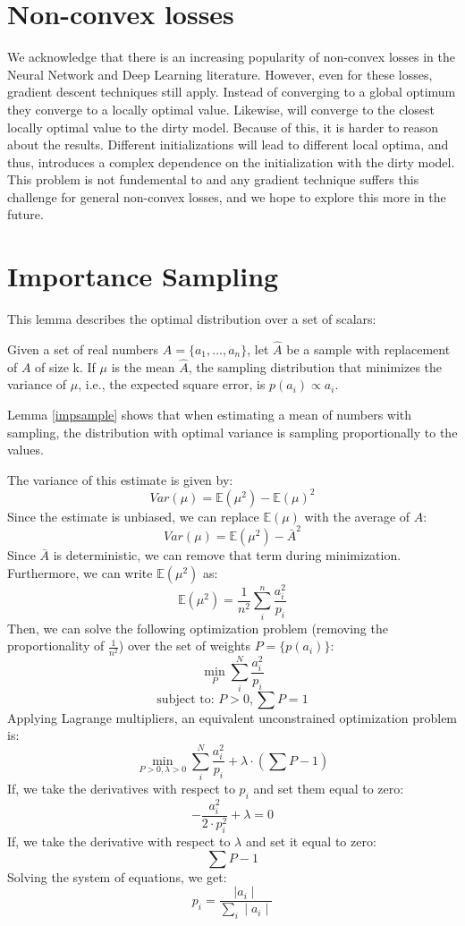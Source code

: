\section{Non-convex losses}\label{non-convex}
We acknowledge that there is an increasing popularity of non-convex losses in the Neural Network and Deep Learning literature. 
However, even for these losses, gradient descent techniques still apply. 
Instead of converging to a global optimum they converge to a locally optimal value. 
Likewise, \sys will converge to the closest locally optimal value to the dirty model. 
Because of this, it is harder to reason about the results.
Different initializations will lead to different local optima, and thus, introduces a complex dependence on the initialization with the dirty model.
This problem is not fundemental to \sys and any gradient technique suffers this challenge for general non-convex losses, and we hope to explore this more in the future.

\section{Importance Sampling}\label{impsample-deriv}
This lemma describes the optimal distribution over a set of scalars:
\begin{lemma}\label{impsample}
Given a set of real numbers $A = \{a_1,...,a_n\}$, let $\hat{A}$ be 
a sample with replacement of $A$ of size k.
If $\mu$ is the mean $\hat{A}$, the sampling distribution that minimizes
 the variance of $\mu$, i.e., the expected square error, is $p(a_i) \propto a_i$.
\end{lemma}
Lemma \ref{impsample} shows that when estimating a mean of numbers with sampling, the distribution with optimal variance is sampling proportionally to the values.

The variance of this estimate is given by:
\[
Var(\mu) = \mathbb{E}(\mu^2)-\mathbb{E}(\mu)^2
\] 
Since the estimate is unbiased, we can replace $\mathbb{E}(\mu)$ with the average of $A$:
\[
Var(\mu) = \mathbb{E}(\mu^2)-\bar{A}^2
\]
Since $\bar{A}$ is deterministic, we can remove that term during minimization.
Furthermore, we can write $\mathbb{E}(\mu^2)$ as:
\[
\mathbb{E}(\mu^2) = \frac{1}{n^2}\sum_i^n \frac{a_i^2}{p_i}
\]
Then, we can solve the following optimization problem (removing the proportionality of $\frac{1}{n^2}$) over the set of weights $P=\{p(a_i)\}$:
\[
\min_{P} \sum_i^N \frac{a_i^2}{p_i}
\]
\[
\text{subject to: } P > 0, \sum P = 1
\]
Applying Lagrange multipliers, an equivalent unconstrained optimization problem is:
\[
\min_{P > 0,\lambda > 0} \sum_i^N \frac{a_i^2}{p_i} + \lambda \cdot (\sum P - 1)
\]
If, we take the derivatives with respect to $p_i$ and set them equal to zero:
\[
-\frac{a_i^2}{2 \cdot p_i^2} + \lambda = 0
\]
If, we take the derivative with respect to $\lambda$ and set it equal to zero:
\[
\sum P - 1
\]
Solving the system of equations, we get:
\[
p_i = \frac{\mid a_i \mid }{\sum_i \mid a_i \mid}
\]

